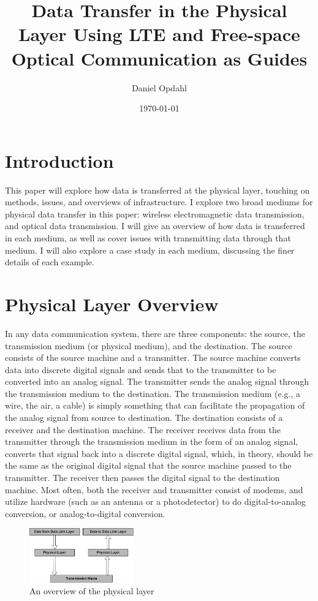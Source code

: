 \documentclass[11pt]{article}
\title{Data Transfer in the Physical Layer Using LTE and Free-space Optical Communication as Guides}
\author{Daniel Opdahl}
\date{\today}
\begin{document}
\maketitle

\tableofcontents

\section{Introduction}

This paper will explore how data is transferred at the physical layer, touching on methods, issues, and overviews of infrastructure. I explore two broad mediums for physical data transfer in this paper: wireless electromagnetic data transmission, and optical data transmission. I will give an overview of how data is transferred in each medium, as well as cover issues with transmitting data through that medium. I will also explore a case study in each medium, discussing the finer details of each example.

\section{Physical Layer Overview}

In any data communication system, there are three components: the source, the transmission medium (or physical medium), and the destination. The source consists of the source machine and a transmitter. The source machine converts data into discrete digital signals and sends that to the transmitter to be converted into an analog signal. The transmitter sends the analog signal through the transmission medium to the destination. The transmission medium (e.g., a wire, the air, a cable) is simply something that can facilitate the propagation of the analog signal from source to destination. The destination consists of a receiver and the destination machine. The receiver receives data from the transmitter through the transmission medium in the form of an analog signal, converts that signal back into a discrete digital signal, which, in theory, should be the same as the original digital signal that the source machine passed to the transmitter. The receiver then passes the digital signal to the destination machine. Most often, both the receiver and transmitter consist of modems, and utilize hardware (such as an antenna or a photodetector) to do digital-to-analog conversion, or analog-to-digital conversion.

\begin{figure}[!htbp]
    \centering
    \includegraphics[width=0.4\textwidth]{PhysicalLayerOverview.png}
    \caption{An overview of the physical layer}
    \label{fig:PhysicalLayerOverview}
\end{figure}
\end{document}
